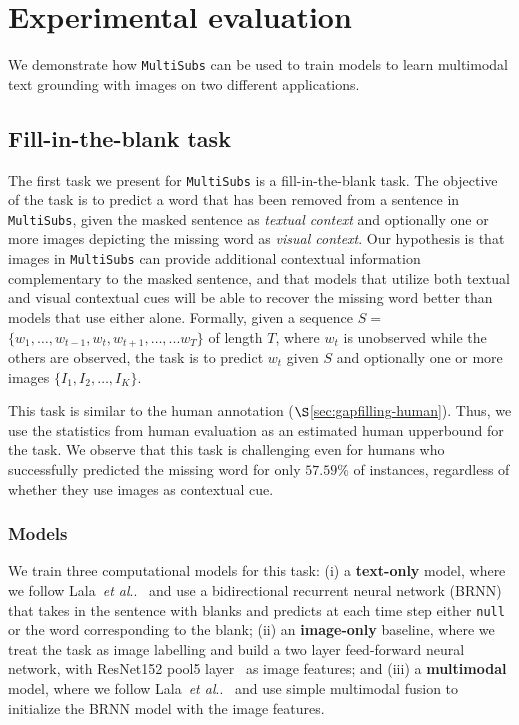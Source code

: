 \documentclass[twocolumn]{svjour3}          \smartqed  \usepackage{graphicx}
\makeatletter
\newcommand{\multisubs}{\texttt{MultiSubs}\xspace}
\DeclareRobustCommand\onedot{\futurelet\@let@token\@onedot}
\def\@onedot{\ifx\@let@token.\else.\null\fi\xspace}
\newcommand{\etal}{\emph{et al}\onedot}
\makeatother
\begin{document}
\section{Experimental evaluation}
\label{sec:experiments}

We demonstrate how \multisubs can be used to train models to learn multimodal text grounding with images on two different applications. 

\subsection{Fill-in-the-blank task}
\label{sec:gapfilling}

The first task we present for \multisubs is a fill-in-the-blank task. 
The objective of the task is to predict a word that has been removed from a sentence in \multisubs, given the masked sentence as \emph{textual context} and optionally one or more images depicting the missing word as \emph{visual context}. Our hypothesis is that images in \multisubs can provide additional contextual information complementary to the masked sentence, and that models that utilize both textual and visual contextual cues will be able to recover the missing word better than models that use either alone. Formally, given a sequence $S$$=$$\{w_1, \ldots, w_{t-1}, w_{t}, w_{t+1}, \ldots, ... w_{T}\}$ of length $T$, where $w_{t}$ is unobserved while the others are observed, the task is to predict $w_{t}$ given $S$ and optionally one or more images $\{I_{1}, I_{2}, \ldots, I_{K}\}$. 

This task is similar to the human annotation ($\S$\ref{sec:gapfilling-human}). Thus, we use the statistics from human evaluation as an estimated human upperbound for the task. We observe that this task is challenging even for humans who successfully predicted the missing word for only $57.59\%$ of instances, regardless of whether they use images as contextual cue.

\subsubsection{Models}
\label{sec:gapfilling-models}

We train three computational models for this task: (i) a \textbf{text-only} model, where we follow Lala~\etal~\cite{LalaEtAl:2019} and use a bidirectional recurrent neural network (BRNN) that takes in the sentence with blanks and predicts at each time step either \texttt{null} or the word corresponding to the blank;  (ii) an \textbf{image-only} baseline, where we treat the task as image labelling and build a two layer feed-forward neural network, with ResNet152 pool5 layer~\cite{HeEtAl:2016} as image features; and 
(iii) a \textbf{multimodal} model, where we follow Lala~\etal~\cite{LalaEtAl:2019} and use simple multimodal fusion to initialize the BRNN model with the image features.   
\end{document}
